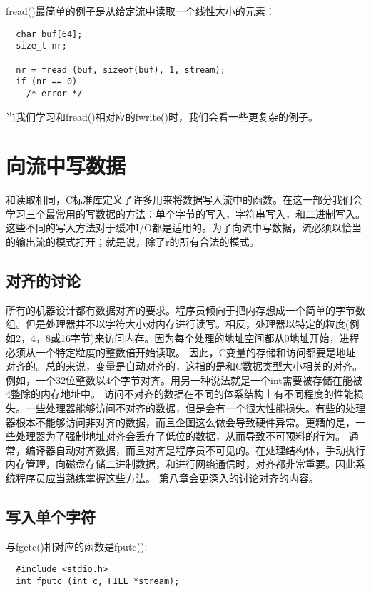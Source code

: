 fread()最简单的例子是从给定流中读取一个线性大小的元素：
\begin{lstlisting}
  char buf[64];
  size_t nr;
  
  nr = fread (buf, sizeof(buf), 1, stream);
  if (nr == 0)
    /* error */
\end{lstlisting}

当我们学习和fread()相对应的fwrite()时，我们会看一些更复杂的例子。 

\section{向流中写数据}

和读取相同，C标准库定义了许多用来将数据写入流中的函数。在这一部分我们会学习三个最常用的写数据的方法：单个字节的写入，字符串写入，和二进制写入。这些不同的写入方法对于缓冲I/O都是适用的。为了向流中写数据，流必须以恰当的输出流的模式打开；就是说，除了r的所有合法的模式。

\subsection{对齐的讨论}
所有的机器设计都有数据对齐的要求。程序员倾向于把内存想成一个简单的字节数组。但是处理器并不以字符大小对内存进行读写。相反，处理器以特定的粒度(例如2，4，8或16字节)来访问内存。因为每个处理的地址空间都从0地址开始，进程必须从一个特定粒度的整数倍开始读取。
因此，C变量的存储和访问都要是地址对齐的。总的来说，变量是自动对齐的，这指的是和C数据类型大小相关的对齐。例如，一个32位整数以4个字节对齐。用另一种说法就是一个int需要被存储在能被4整除的内存地址中。
访问不对齐的数据在不同的体系结构上有不同程度的性能损失。一些处理器能够访问不对齐的数据，但是会有一个很大性能损失。有些的处理器根本不能够访问非对齐的数据，而且企图这么做会导致硬件异常。更糟的是，一些处理器为了强制地址对齐会丢弃了低位的数据，从而导致不可预料的行为。
通常，编译器自动对齐数据，而且对齐是程序员不可见的。在处理结构体，手动执行内存管理，向磁盘存储二进制数据，和进行网络通信时，对齐都非常重要。因此系统程序员应当熟练掌握这些方法。
第八章会更深入的讨论对齐的内容。


\subsection{写入单个字符}

与fgetc()相对应的函数是fputc():
\begin{lstlisting}
  #include <stdio.h>
  int fputc (int c, FILE *stream);
\end{lstlisting}

